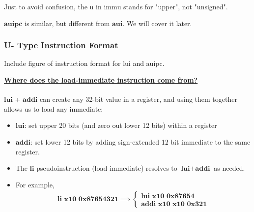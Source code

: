 \documentclass[11pt]{article}
\begin{document}
\begin{redbox}
  \begin{remark}
    {Just to avoid confusion, the $\mathrm{u}$ in $\mathrm{immu}$ stands for "upper", not "unsigned".}
  \end{remark}
\end{redbox}

\begin{redbox}
  \begin{remark}
    {${\mathrm{\textbf{auipc}}}$ is similar, but different from $\mathbf{\mathrm{\textbf{aui}}}$. We will cover it later.}
  \end{remark}
\end{redbox}

\subsubsection{U- Type Instruction Format}

\begin{center}
  Include figure of instruction format for lui and auipc.
\end{center}

\begin{bluebox}
\underline{\textbf{Where does the load-immediate instruction come from?}} 
\\
\\
$\mathrm{\textbf{lui}}$ + $\mathrm{\textbf{addi}}$ can create any 32-bit value in a register, and using them together allows us to load any immediate:
\begin{itemize}
  \item $\mathrm{\textbf{lui}}$: set upper 20 bits (and zero out lower 12 bits) within a register
  \item $\mathrm{\textbf{addi}}$: set lower 12 bits by adding sign-extended 12 bit immediate to the same register.
  \item The $\mathrm{\textbf{li}}$ pseudoinstruction (load immediate) resolves to $\mathrm{\textbf{lui}} + \mathrm{\textbf{addi}}$ as needed.
  \item For example,
  \begin{align*}
    \mathrm{\textbf{li x10 0x87654321}} \implies \begin{cases}
      \mathrm{\textbf{lui x10 0x87654}} \\
      \mathrm{\textbf{addi x10 x10 0x321}}
    \end{cases} 
  \end{align*}
\end{itemize}
\end{bluebox}
\end{document}
